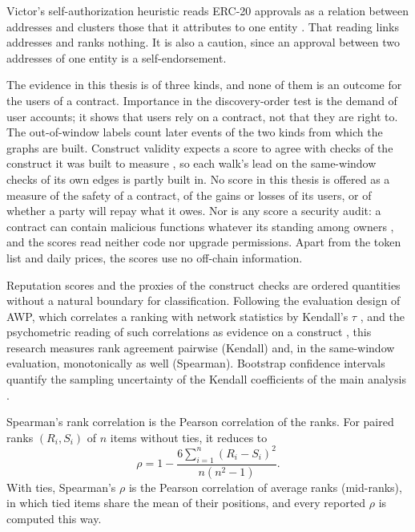 Victor's self-authorization heuristic reads ERC-20 approvals as a relation between addresses and clusters those that it attributes to one entity \parencite{victor2020clustering}. That reading links addresses and ranks nothing. It is also a caution, since an approval between two addresses of one entity is a self-endorsement.


The evidence in this thesis is of three kinds, and none of them is an outcome for the users of a contract. Importance in the discovery-order test is the demand of user accounts; it shows that users rely on a contract, not that they are right to. The out-of-window labels count later events of the two kinds from which the graphs are built. Construct validity expects a score to agree with checks of the construct it was built to measure \parencite{cronbach1955construct}, so each walk's lead on the same-window checks of its own edges is partly built in. No score in this thesis is offered as a measure of the safety of a contract, of the gains or losses of its users, or of whether a party will repay what it owes. Nor is any score a security audit: a contract can contain malicious functions whatever its standing among owners \parencite{lin2024crpwarner}, and the scores read neither code nor upgrade permissions. Apart from the token list and daily prices, the scores use no off-chain information.


Reputation scores and the proxies of the construct checks are ordered quantities without a natural boundary for classification. Following the evaluation design of AWP, which correlates a ranking with network statistics by Kendall's $\tau$ \parencite{do2023awp}, and the psychometric reading of such correlations as evidence on a construct \parencite{cronbach1955construct}, this research measures rank agreement pairwise (Kendall) and, in the same-window evaluation, monotonically as well (Spearman). Bootstrap confidence intervals quantify the sampling uncertainty of the Kendall coefficients of the main analysis \parencite{efron1979bootstrap}.

Spearman's rank correlation \parencite{spearman1904proof} is the Pearson correlation of the ranks. For paired ranks $(R_i,S_i)$ of $n$ items without ties, it reduces to
\begin{equation}
\rho = 1 - \frac{6\sum_{i=1}^n (R_i-S_i)^2}{n(n^2-1)}.
\label{eq:spearman}
\end{equation}
With ties, Spearman's $\rho$ is the Pearson correlation of average ranks (mid-ranks), in which tied items share the mean of their positions, and every reported $\rho$ is computed this way.

